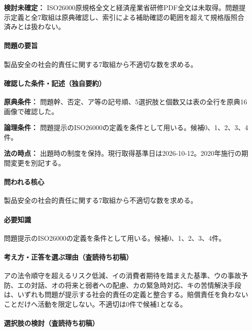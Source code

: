 \par\textbf{検討未確定：} ISO26000原規格全文と経済産業省研修PDF全文は未取得。問題提示定義と全7取組は原典確認し、索引による補助確認の範囲を超えて規格版照合済みとは扱わない。

\paragraph{問題の要旨} 製品安全の社会的責任に関する7取組から不適切な数を求める。

\paragraph{確認した条件・記述（独自要約）}\mbox{}\par

\noindent\textbf{原典条件：} 問題幹、否定、ア等の記号順、5選択肢と個数又は表の全行を原典16画像で確認した。\par

\noindent\textbf{論理条件：} 問題提示のISO26000の定義を条件として用いる。候補0、1、2、3、4件。\par

\noindent\textbf{法の時点：} 出題時の制度を保持。現行取得基準日は2026-10-12。2020年施行の期間変更を別記する。\par

\paragraph{問われる核心} 製品安全の社会的責任に関する7取組から不適切な数を求める。

\paragraph{必要知識} 問題提示のISO26000の定義を条件として用いる。候補0、1、2、3、4件。

\paragraph{考え方・正答を選ぶ理由（査読待ち初稿）} アの法令順守を超えるリスク低減、イの消費者期待を踏まえた基準、ウの事故予防、エの対話、オの将来と弱者への配慮、カの緊急時対応、キの苦情解決手段は、いずれも問題が提示する社会的責任の定義と整合する。賠償責任を負わないことだけへ活動を限定しない。不適切は0件で候補1となる。

\paragraph{選択肢の検討（査読待ち初稿）}\mbox{}\par

